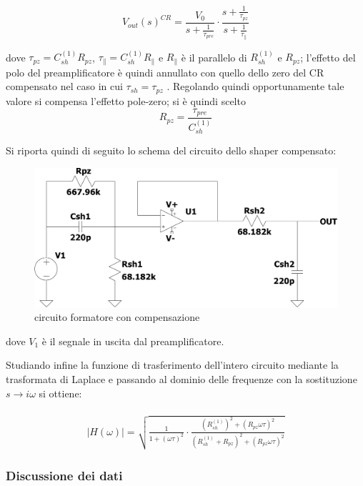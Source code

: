 \documentclass{article}
\begin{document}
\begin{equation}
    V_{out}(s)^{CR}=\frac{V_{0}}{s+\frac{1}{\tau_{pre}}}\cdot \frac{s+\frac{1}{\tau_{pz}}}{s+\frac{1}{\tau_{\parallel}}}
\end{equation}


dove $\tau_{pz}= C_{sh}^{(1)}R_{pz}$, $\tau_{\parallel}= C_{sh}^{(1)}R_{\parallel}$ e $R_{\parallel}$ è il parallelo di $R_{sh}^{(1)}$ e $R_{pz}$;
l’effetto del polo del preamplificatore è quindi annullato con quello dello zero del CR compensato nel caso in cui $\tau_{sh}=\tau_{pz}$ .
Regolando quindi opportunamente tale valore si compensa l'effetto pole-zero;
 si è quindi scelto 
$$R_{pz}= \frac{\tau_{pre}}{C_{sh}^{(1)}}$$



Si riporta quindi di seguito lo schema del circuito dello shaper compensato:
\begin{center}
    \begin{figure}[H]
    \centering
    \includegraphics[scale=0.3, angle=0]{shapercomp.pdf}
    \caption{circuito formatore con compensazione}
    \label{fig:shaper_pz}
    \end{figure}
\end{center}
dove $V_1$ è il segnale in uscita dal preamplificatore.

Studiando infine la funzione di trasferimento dell'intero circuito  mediante la trasformata di Laplace e passando al dominio delle frequenze con la sostituzione $s\xrightarrow[]{} i\omega$ si ottiene:

\begin{multline}
    \label{eqn:shapercomp_trasf}
    |H(\omega)| =\sqrt{\frac{1}{1+(\omega\tau)^2}\cdot \frac{(R_{sh}^{(1)})^2+(R_{pz}\omega\tau)^2 }{(R_{sh}^{(1)}+R_{pz})^2+(R_{pz}\omega\tau)^2}}
\end{multline}

\subsubsection{Discussione dei dati}
\end{document}
